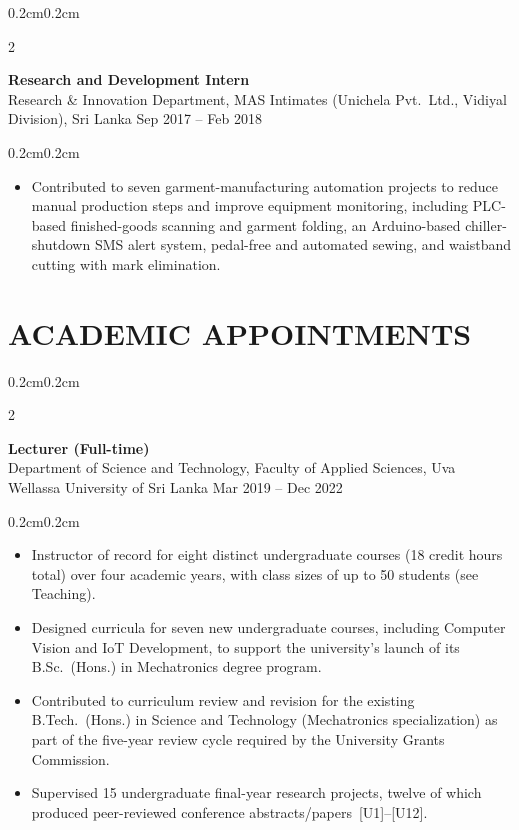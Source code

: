 \documentclass[10pt, letterpaper]{article}
\newenvironment{highlights}{%
    \begin{itemize}[topsep=0.08cm, parsep=0.08cm, partopsep=0pt,
                    itemsep=0pt, leftmargin=0.4cm + 10pt]
}{\end{itemize}}
\newenvironment{onecolentry}{%
    \begin{adjustwidth}{0.2cm}{0.2cm}
}{\end{adjustwidth}}
\newenvironment{twocolentry}[2][]{%
    \onecolentry
    \def\secondColumn{#2}
    \setcolumnwidth{\fill, 4.2cm}
    \begin{paracol}{2}
}{%
    \switchcolumn \raggedleft \secondColumn
    \end{paracol}
    \endonecolentry
}
\begin{document}
\begin{twocolentry}{Sep 2017 -- Feb 2018}
    \textbf{Research and Development Intern} \\
    Research \& Innovation Department, MAS Intimates
    (Unichela Pvt.\ Ltd., Vidiyal Division), Sri Lanka
\end{twocolentry}
\begin{onecolentry}
    \begin{highlights}
        \item Contributed to seven garment-manufacturing automation projects
              to reduce manual production steps and improve equipment
              monitoring, including PLC-based finished-goods scanning and
              garment folding, an Arduino-based chiller-shutdown SMS alert
              system, pedal-free and automated sewing, and waistband cutting
              with mark elimination.
    \end{highlights}
    \vspace{0.08cm}
\end{onecolentry}

\section{ACADEMIC APPOINTMENTS}
\vspace{0.08cm}

\begin{twocolentry}{Mar 2019 -- Dec 2022}
    \textbf{Lecturer (Full-time)} \\
    Department of Science and Technology, Faculty of Applied Sciences,
    Uva Wellassa University of Sri Lanka
\end{twocolentry}
\begin{onecolentry}
    \begin{highlights}
        \item Instructor of record for eight distinct undergraduate courses
      (18 credit hours total) over four academic years, with class sizes
      of up to 50 students (see Teaching).

        \item Designed curricula for seven new undergraduate courses, including
      Computer Vision and IoT Development, to support the university's
      launch of its B.Sc.\ (Hons.) in Mechatronics degree program.

        \item Contributed to curriculum review and revision for the existing
      B.Tech.\ (Hons.) in Science and Technology (Mechatronics specialization)
      as part of the five-year review cycle required by the
      University Grants Commission.

        \item Supervised 15 undergraduate final-year research projects, twelve of
              which produced peer-reviewed conference abstracts/papers~[U1]--[U12].
    \end{highlights}
    \vspace{0.12cm}
\end{onecolentry}
\end{document}
